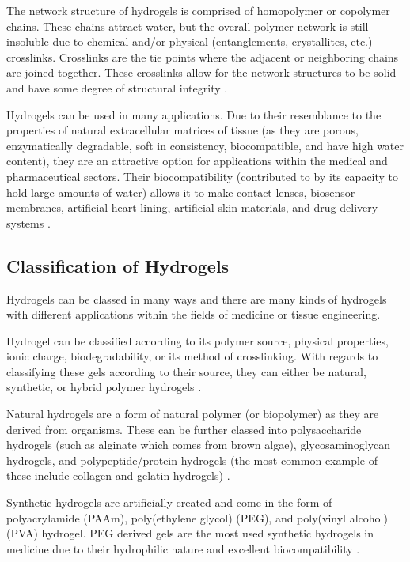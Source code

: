 The network structure of hydrogels is comprised of homopolymer or copolymer chains. These chains attract water, but the overall polymer network is still insoluble due to chemical and/or physical (entanglements, crystallites, etc.) crosslinks. Crosslinks are the tie points where the adjacent or neighboring chains are joined together. These crosslinks allow for the network structures to be solid and have some degree of structural integrity \citep{peppas_2000}.

Hydrogels can be used in many applications. Due to their resemblance to the properties of natural extracellular matrices of tissue (as they are porous, enzymatically degradable, soft in consistency, biocompatible, and have high water content), they are an attractive option for applications within the medical and pharmaceutical sectors. Their biocompatibility (contributed to by its capacity to hold large amounts of water) allows it to make contact lenses, biosensor membranes, artificial heart lining, artificial skin materials, and drug delivery systems \citep{peppas_2000}.

\subsection{Classification of Hydrogels}
Hydrogels can be classed in many ways and there are many kinds of hydrogels with different applications within the fields of medicine or tissue engineering.

Hydrogel can be classified according to its polymer source, physical properties, ionic charge, biodegradability, or its method of crosslinking. With regards to classifying these gels according to their source, they can either be natural, synthetic, or hybrid polymer hydrogels \citep{liwu2020}. 

Natural hydrogels are a form of natural polymer (or biopolymer) as they are derived from organisms. These can be further classed into polysaccharide hydrogels (such as alginate which comes from brown algae), glycosaminoglycan hydrogels, and polypeptide/protein hydrogels (the most common example of these include collagen and gelatin hydrogels) \citep{liwu2020}.

Synthetic hydrogels are artificially created and come in the form of polyacrylamide (PAAm), poly(ethylene glycol) (PEG), and poly(vinyl alcohol) (PVA) hydrogel. PEG derived gels are the most used synthetic hydrogels in medicine due to their hydrophilic nature and excellent biocompatibility \citep{liwu2020}.

